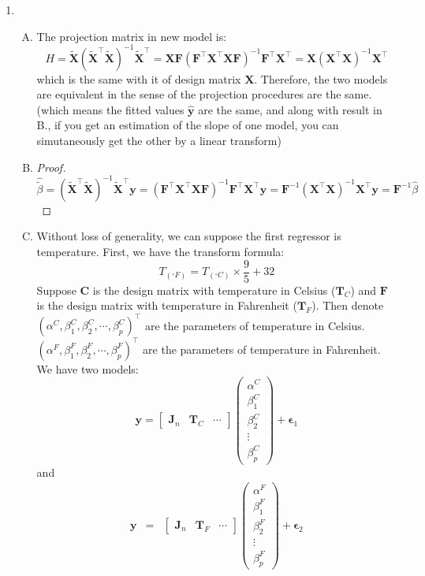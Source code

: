 \documentclass[12pt]{article}
\newcommand{\ttt}[1]{\textbf{#1}}
\begin{document}
\begin{enumerate}
    \item
    \begin{enumerate}[A.]
        \item
        The projection matrix in new model is:
        $$H = \tilde{\ttt{X}}(\tilde{\ttt{X}}^\top \tilde{\ttt{X}})^{-1}\tilde{\ttt{X}}^\top = \ttt{X}\ttt{F}(\ttt{F}^\top \ttt{X}^\top \ttt{X} \ttt{F})^{-1} \ttt{F}^\top \ttt{X}^\top = \ttt{X}(\ttt{X}^\top \ttt{X})^{-1}\ttt{X}^\top$$
        which is the same with it of design matrix $\ttt{X}$. Therefore, the two models are equivalent in the sense of the projection procedures are the same. (which means the fitted values $\hat{\ttt{y}}$ are the same, and along with result in B., if you get an estimation of the slope of one model, you can simutaneously get the other by a linear transform)
        \item
        \begin{proof}
            $$\hat{\tilde{\beta}} = (\tilde{\ttt{X}}^\top \tilde{\ttt{X}})^{-1}\tilde{\ttt{X}}^\top \ttt{y} = (\ttt{F}^\top \ttt{X}^\top \ttt{X} \ttt{F})^{-1} \ttt{F}^\top \ttt{X}^\top \ttt{y} = \ttt{F}^{-1}(\ttt{X}^\top \ttt{X})^{-1}\ttt{X}^\top \ttt{y} = \ttt{F}^{-1} \hat{\beta}$$    
        \end{proof}
        \item
        Without loss of generality, we can suppose the first regressor is temperature. First, we have the transform formula:
        $$T_{( ^\circ F)} = T_{(^\circ C)} \times \frac{9}{5} + 32$$
        Suppose $\ttt{C}$ is the design matrix with temperature in Celsius ($\ttt{T}_C$) and $\ttt{F}$ is the design matrix with temperature in Fahrenheit ($\ttt{T}_F$). 
        Then denote $(\alpha^C, \beta^C_1, \beta^C_2, \cdots, \beta^C_p)^\top$ are the parameters of temperature in Celsius. $(\alpha^F, \beta^F_1, \beta^F_2, \cdots, \beta^F_p)^\top$ are the parameters of temperature in Fahrenheit.
        We have two models:
        $$ \ttt{y} = \begin{bmatrix} \ttt{J}_n&\ttt{T}_C&\cdots \end{bmatrix} \begin{pmatrix} \alpha^C\\ \beta^C_1\\ \beta^C_2\\ \vdots\\ \beta^C_p \end{pmatrix} + \bm{\epsilon}_1$$
        and 
        \begin{eqnarray}
            \ttt{y} &=& \begin{bmatrix} \ttt{J}_n&\ttt{T}_F&\cdots \end{bmatrix} \begin{pmatrix} \alpha^F\\ \beta^F_1\\ \beta^F_2\\ \vdots\\ \beta^F_p \end{pmatrix} + \bm{\epsilon}_2 \\

\end{eqnarray}
\end{enumerate}
\end{enumerate}
\end{document}
